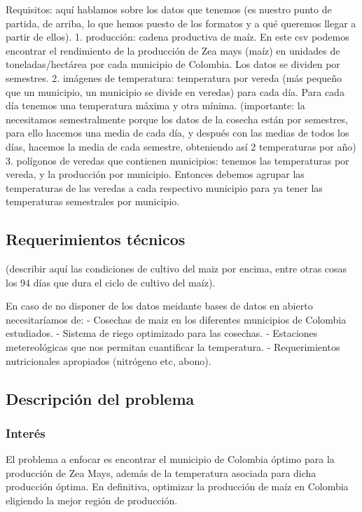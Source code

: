 \documentclass[12pt, spanish]{article}
\begin{document}
Requisitos: aquí hablamos sobre los datos que tenemos (es nuestro punto de partida, de arriba, lo que hemos puesto de los formatos y a qué queremos llegar a partir de ellos).
1. producción: cadena productiva de maíz. En este csv podemos encontrar el rendimiento de la producción de Zea mays (maíz) en unidades de toneladas/hectárea por cada municipio de Colombia. Los datos se dividen por semestres.
2. imágenes de temperatura: temperatura por vereda (más pequeño que un municipio, un municipio se divide en veredas) para cada día. Para cada día tenemos una temperatura máxima y otra mínima. (importante: la necesitamos semestralmente porque los datos de la cosecha están por semestres, para ello hacemos una media de cada día, y después con las medias de todos los días, hacemos la media de cada semestre, obteniendo así 2 temperaturas por año)
3. polígonos de veredas que contienen municipios: tenemos las temperaturas por vereda, y la producción por municipio. Entonces debemos agrupar las temperaturas de las veredas a cada respectivo municipio para ya tener las temperaturas semestrales por municipio.

\subsection{Requerimientos técnicos}

(describir aquí las condiciones de cultivo del maiz por encima, entre otras cosas los 94 días que dura el ciclo de cultivo del maíz).

En caso de no disponer de los datos meidante bases de datos en abierto necesitaríamos de: 
- Cosechas de maiz en los diferentes municipios de Colombia estudiados.
- Sistema de riego optimizado para las cosechas.
- Estaciones metereológicas que nos permitan cuantificar la temperatura.
- Requerimientos nutricionales apropiados (nitrógeno etc, abono).

\subsection{Descripción del problema}

\subsubsection{Interés}

El problema a enfocar es encontrar el municipio de Colombia óptimo para la producción de Zea Mays, además de la temperatura asociada para dicha producción óptima. En definitiva, optimizar la producción de maíz en Colombia eligiendo la mejor región de producción.
        
\end{document}
